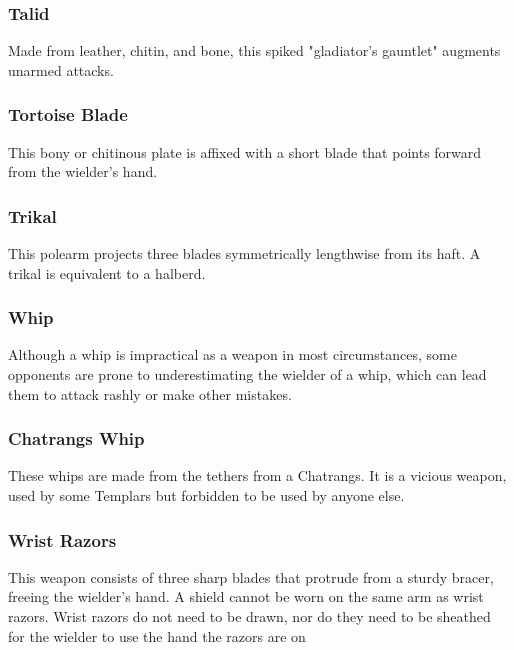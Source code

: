 \begin{multicols}{2}
\subsubsection{Talid}
\label{itmmlee:talid}
Made from leather, chitin, and bone, this spiked
"gladiator's gauntlet" augments unarmed attacks.

\subsubsection{Tortoise Blade}
\label{itmmlee:tortoiseblade}
This bony or chitinous plate is affixed with a short
blade that points forward from the wielder's hand.

\subsubsection{Trikal}
\label{itmmlee:trikal}
This polearm projects three blades symmetrically lengthwise
from its haft. A trikal is equivalent to a halberd.

\subsubsection{Whip}
\label{itmmlee:whip}
Although a whip is impractical as a weapon
in most circumstances, some opponents are prone
to underestimating the wielder of a whip, which can
lead them to attack rashly or make other mistakes.

\subsubsection{Chatrangs Whip}
\label{itmmlee:chatrangswhip}
These whips are made from the tethers from a Chatrangs. It
is a vicious weapon, used by some Templars but forbidden to
be used by anyone else.

\subsubsection{Wrist Razors}
\label{itmmlee:wristrazors}
This weapon consists of three sharp blades that protrude from
a sturdy bracer, freeing the wielder's hand. A shield cannot
be worn on the same arm as wrist razors. Wrist razors do not
need to be drawn, nor do they need to be sheathed for the
wielder to use the hand the razors are on

\end{multicols}
